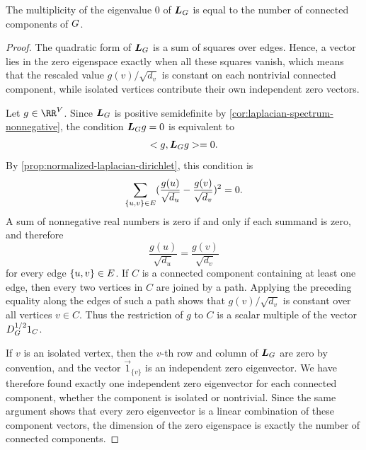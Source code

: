 \begin{lemma}
	\label{lem:zero-eigenvalues-components}
	The multiplicity of the eigenvalue \(0\) of \(\boldsymbol{L}_{G}\) is equal to the number of connected components of \(G\).
\end{lemma}

\begin{proof}
	The quadratic form of \(\boldsymbol{L}_{G}\) is a sum of squares over edges. Hence, a vector lies in the zero eigenspace exactly when all these squares vanish, which means that the rescaled value \(g(v)/\sqrt{d_v}\) is constant on each nontrivial connected component, while isolated vertices contribute their own independent zero vectors.

	Let \(g\in\RR^\Vertices\). Since \(\boldsymbol{L}_{G}\) is positive semidefinite by \cref{cor:laplacian-spectrum-nonnegative}, the condition \(\boldsymbol{L}_{G}g=0\) is equivalent to
	\begin{equation}
		< g,\boldsymbol{L}_{G}g>=0.
	\end{equation}
	By \cref{prop:normalized-laplacian-dirichlet}, this condition is
	\begin{equation}
		\sum_{\{u,v\}\in E}(\frac{g(u)}{\sqrt{d_u}}-\frac{g(v)}{\sqrt{d_v}})^2=0.
	\end{equation}
	A sum of nonnegative real numbers is zero if and only if each summand is zero, and therefore
	\begin{equation}
		\frac{g(u)}{\sqrt{d_u}}=\frac{g(v)}{\sqrt{d_v}}
	\end{equation}
	for every edge \(\{u,v\}\in E\). If \(C\) is a connected component containing at least one edge, then every two vertices in \(C\) are joined by a path. Applying the preceding equality along the edges of such a path shows that \(g(v)/\sqrt{d_v}\) is constant over all vertices \(v\in C\). Thus the restriction of \(g\) to \(C\) is a scalar multiple of the vector \(D_{G}^{1/2}1_C\).

	If \(v\) is an isolated vertex, then the \(v\)-th row and column of \(\boldsymbol{L}_{G}\) are zero by convention, and the vector \(\vec{1}_{\{v\}}\) is an independent zero eigenvector. We have therefore found exactly one independent zero eigenvector for each connected component, whether the component is isolated or nontrivial. Since the same argument shows that every zero eigenvector is a linear combination of these component vectors, the dimension of the zero eigenspace is exactly the number of connected components.
\end{proof}

